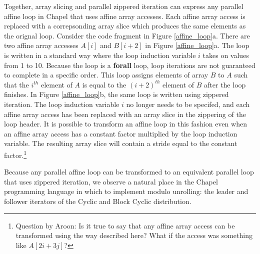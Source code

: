 Together, array slicing and parallel zippered iteration can express any parallel affine loop in Chapel that uses affine array accesses. Each affine array access is replaced with a correpsonding array slice which produces the same elements as the orignal loop. Consider the code fragment in Figure \ref{affine_loop}a. There are two affine array accesses $A[i]$ and $B[i+2]$ in Figure \ref{affine_loop}a. The loop is written in a standard way where the loop induction variable $i$ takes on values from 1 to 10. Because the loop is a \textbf{forall} loop, loop iterations are not guaranteed to complete in a specific order. This loop assigns elements of array $B$ to $A$ such that the $i^{th}$ element of $A$ is equal to the $(i+2)^{th}$ element of $B$ after the loop finishes. In Figure \ref{affine_loop}b, the same loop is written using zippered iteration. The loop induction variable $i$ no longer needs to be specifed, and each affine array access has been replaced with an array slice in the zippering of the loop header. It is possible to transform an affine loop in this fashion even when an affine array access has a constant factor multiplied by the loop induction variable. The resulting array slice will contain a stride equal to the constant factor.\footnote{Question by Aroon: Is it true to say that any affine array access can be transformed using the way described here? What if the access was something like $A[2i+3j]$?}

Because any parallel affine loop can be transformed to an equivalent parallel loop that uses zippered iteration, we observe a natural place in the Chapel programming language in which to implement modulo unrolling: the leader and follower iterators of the Cyclic and Block Cyclic distribution. 

